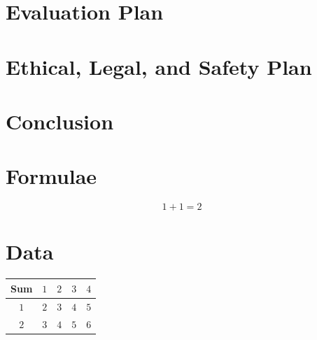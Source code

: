 \documentclass[journal]{IEEEtran}
\begin{document}
\section{Evaluation Plan}

\section{Ethical, Legal, and Safety Plan}

\section{Conclusion}

\newpage
\appendices

\section{Formulae}
$$1 + 1 = 2$$

\section{Data}

\begin{table}[H]
  \centering
  \begin{tabular}{c|cccc}
    Sum             & $1$ & $2$ & $3$ & $4$ \\
    \hline
    $1$             & $2$ & $3$ & $4$ & $5$ \\
    $2$             & $3$ & $4$ & $5$ & $6$ \\
  \end{tabular}
\end{table}
\end{document}
